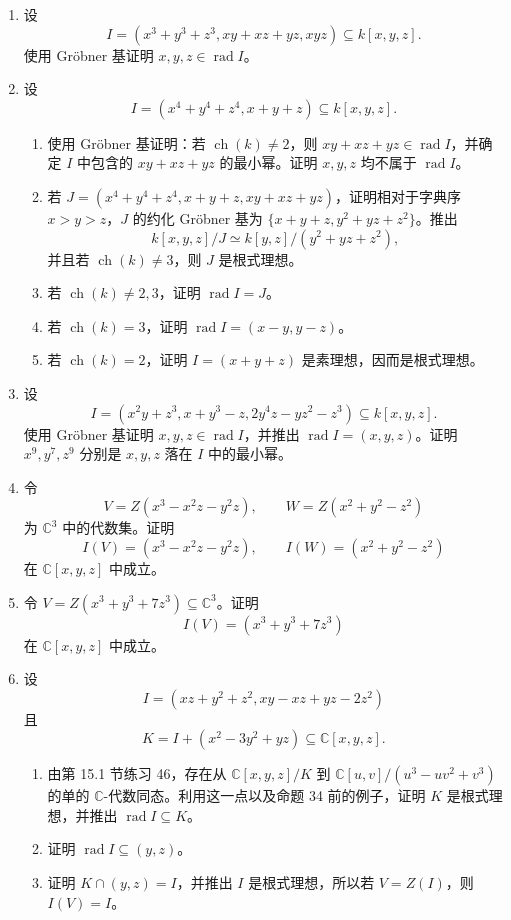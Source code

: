 \begin{enumerate}[label=\arabic*.]
\[	\]
	使用 Gröbner 基证明：若 $\operatorname{ch}(k)\ne2,3$，则 $x,y,z\in\operatorname{rad}I$。
	\item 设
	\[
	I=(x^3+y^3+z^3,
	xy+xz+yz,
	xyz)\subseteq k[x,y,z].
	\]
	使用 Gröbner 基证明 $x,y,z\in\operatorname{rad}I$。
	\item 设
	\[
	I=(x^4+y^4+z^4,
	x+y+z)\subseteq k[x,y,z].
	\]
	\begin{enumerate}[label=(\alph*)]
		\item 使用 Gröbner 基证明：若 $\operatorname{ch}(k)\ne2$，则 $xy+xz+yz\in\operatorname{rad}I$，并确定 $I$ 中包含的 $xy+xz+yz$ 的最小幂。证明 $x,y,z$ 均不属于 $\operatorname{rad}I$。
		\item 若 $J=(x^4+y^4+z^4,
		x+y+z,
		xy+xz+yz)$，证明相对于字典序 $x>y>z$，$J$ 的约化 Gröbner 基为 $\{x+y+z,
		y^2+yz+z^2\}$。推出
		\[
		k[x,y,z]/J\simeq k[y,z]/(y^2+yz+z^2),
		\]
		并且若 $\operatorname{ch}(k)\ne3$，则 $J$ 是根式理想。
		\item 若 $\operatorname{ch}(k)\ne2,3$，证明 $\operatorname{rad}I=J$。
		\item 若 $\operatorname{ch}(k)=3$，证明 $\operatorname{rad}I=(x-y,y-z)$。
		\item 若 $\operatorname{ch}(k)=2$，证明 $I=(x+y+z)$ 是素理想，因而是根式理想。
	\end{enumerate}
	\item 设
	\[
	I=(x^2y+z^3,
	x+y^3-z,
	2y^4z-yz^2-z^3)\subseteq k[x,y,z].
	\]
	使用 Gröbner 基证明 $x,y,z\in\operatorname{rad}I$，并推出 $\operatorname{rad}I=(x,y,z)$。证明 $x^9,y^7,z^9$ 分别是 $x,y,z$ 落在 $I$ 中的最小幂。
	\item 令
	\[
	V=Z(x^3-x^2z-y^2z),
	\qquad
	W=Z(x^2+y^2-z^2)
	\]
	为 $\mathbb C^3$ 中的代数集。证明
	\[
	I(V)=(x^3-x^2z-y^2z),
	\qquad
	I(W)=(x^2+y^2-z^2)
	\]
	在 $\mathbb C[x,y,z]$ 中成立。
	\item 令 $V=Z(x^3+y^3+7z^3)\subseteq\mathbb C^3$。证明
	\[
	I(V)=(x^3+y^3+7z^3)
	\]
	在 $\mathbb C[x,y,z]$ 中成立。
	\item 设
	\[
	I=(xz+y^2+z^2,
	xy-xz+yz-2z^2)
	\]
	且
	\[
	K=I+(x^2-3y^2+yz)\subseteq\mathbb C[x,y,z].
	\]
	\begin{enumerate}[label=(\alph*)]
		\item 由第 15.1 节练习 46，存在从 $\mathbb C[x,y,z]/K$ 到 $\mathbb C[u,v]/(u^3-uv^2+v^3)$ 的单的 $\mathbb C$-代数同态。利用这一点以及命题 34 前的例子，证明 $K$ 是根式理想，并推出 $\operatorname{rad}I\subseteq K$。
		\item 证明 $\operatorname{rad}I\subseteq (y,z)$。
		\item 证明 $K\cap(y,z)=I$，并推出 $I$ 是根式理想，所以若 $V=Z(I)$，则 $I(V)=I$。

\end{enumerate}
\end{enumerate}
